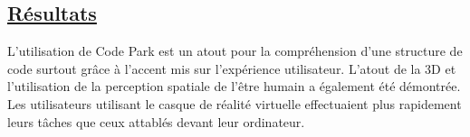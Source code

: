 \documentclass[a4paper,10pt, oneside]{article}
\begin{document}
\subsection{\ul{Résultats}}
    \par L'utilisation de Code Park est un atout pour la compréhension d'une structure de code surtout grâce à l'accent mis sur l'expérience utilisateur.
    L'atout de la 3D et l'utilisation de la perception spatiale de l'être humain a également été démontrée. Les utilisateurs utilisant le casque de réalité virtuelle effectuaient 
    plus rapidement leurs tâches que ceux attablés devant leur ordinateur.
\newpage


\end{document}
